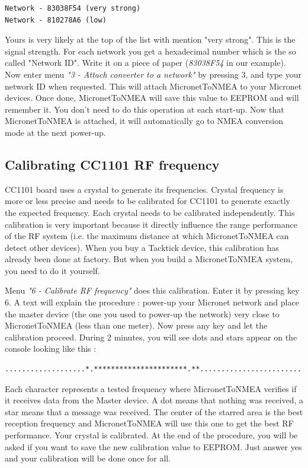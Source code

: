 \documentclass{report}
\begin{document}
\begin{verbatim}
Network - 83038F54 (very strong)
Network - 810278A6 (low)
\end{verbatim}

Yours is very likely at the top of the list with mention "very strong". This is the signal strength. For each network you get a hexadecimal number which is the so called "Network ID". Write it on a piece of paper (\emph{83038F54} in our example).
Now enter menu \emph{"3 - Attach converter to a network"} by pressing 3, and type your network ID when requested. This will attach MicronetToNMEA to your Micronet devices.
Once done, MicronetToNMEA will save this value to EEPROM and will remember it. You don't need to do this operation at each start-up. Now that MicronetToNMEA is attached, it will automatically go to NMEA conversion mode at the next power-up.

\subsection{Calibrating CC1101 RF frequency}

CC1101 board uses a crystal to generate its frequencies. Crystal frequency is more or less precise and needs to be calibrated for CC1101 to generate exactly the expected frequency. Each crystal needs to be calibrated independently. This calibration is very important because it directly influence the range performance of the RF system (i.e. the maximum distance at which MicronetToNMEA can detect other devices). When you buy a Tacktick device, this calibration has already been done at factory. But when you build a MicronetToNMEA system, you need to do it yourself.

Menu \emph{"6 - Calibrate RF frequency"} does this calibration. Enter it by pressing key 6. A text will explain the procedure : power-up your Micronet network and place the master device (the one you used to power-up the network) very close to MicronetToNMEA (less than one meter). Now press any key and let the calibration proceed. During 2 minutes, you will see dots and stars appear on the console looking like this :

\begin{verbatim}
...................*.**********************.**.....................................
\end{verbatim}

Each character represents a tested frequency where MicronetToNMEA verifies if it receives data from the Master device. A dot means that nothing was received, a star means that a message was received. The center of the starred area is the best reception frequency and MicronetToNMEA will use this one to get the best RF performance. Your crystal is calibrated.
At the end of the procedure, you will be asked if you want to save the new calibration value to EEPROM. Just answer yes and your calibration will be done once for all.
\end{document}
